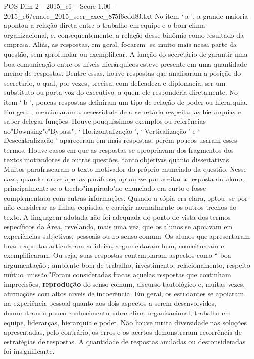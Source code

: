 \begin{textsample}{POS Dim 2 – 2015\_c6 – Score 1.00 – 2015\_c6/enade\_2015\_secr\_exec\_875f6cdd83.txt}
No item ‘ a ’, a grande maioria apontou a relação direta entre o trabalho em equipe e o bom clima organizacional, e, consequentemente, a relação desse binômio como resultado da empresa.
Aliás, as respostas, em geral, focaram -se muito mais nessa parte da questão, sem aprofundar ou exemplificar.
A função do secretário de garantir uma boa comunicação entre os níveis hierárquicos esteve presente em uma quantidade menor de respostas.
Dentre essas, houve respostas que analisaram a posição do secretário, o qual, por vezes, precisa, com delicadeza e diplomacia, ser um substituto ou porta-voz do executivo, a quem ele responderia diretamente.
No item ‘ b ’, poucas respostas definiram um tipo de relação de poder ou hierarquia.
Em geral, mencionaram a necessidade de o secretário respeitar as hierarquias e saber delegar funções.
Houve pouquíssimos exemplos ou referências ao"Downsing"e"Bypass". ‘ Horizontalização ’, ‘ Verticalização ’ e ‘ Descentralização ’ apareceram em mais respostas, porém poucos usaram esses termos.
Houve casos em que as respostas se apropriavam dos fragmentos dos textos motivadores de outras questões, tanto objetivas quanto dissertativas.
Muitos parafrasearam o texto motivador do próprio enunciado da questão.
Nesse caso, quando houve apenas paráfrase, optou -se por aceitar a resposta do aluno, principalmente se o trecho"inspirado"no enunciado era curto e fosse complementado com outras informações.
Quando a cópia era clara, optou -se por não considerar as linhas copiadas e corrigir normalmente os outros trechos do texto.
A linguagem adotada não foi adequada do ponto de vista dos termos específicos da Área, revelando, mais uma vez, que os alunos se apoiavam em experiências subjetivas, pessoais ou no senso comum.
Os alunos que apresentaram boas respostas articularam as ideias, argumentaram bem, conceituaram e exemplificaram.
Ou seja, suas respostas contemplaram aspectos como “ boa argumentação ; ambiente bom de trabalho, investimento, relacionamento, respeito mútuo, missão."Foram consideradas fracas aquelas respostas que continham imprecisões, \textbf{reprodução} do senso comum, discurso tautológico e, muitas vezes, afirmações com altos níveis de incoerência.
Em geral, os estudantes se apoiaram na experiência pessoal quanto aos dois aspectos a serem desenvolvidos, demonstrando pouco conhecimento sobre clima organizacional, trabalho em equipe, lideranças, hierarquia e poder.
Não houve muita diversidade nas soluções apresentadas, pelo contrário, os erros e os acertos demonstraram recorrência de estratégias de respostas.
A quantidade de respostas anuladas ou desconsideradas foi insignificante.

\end{textsample}
